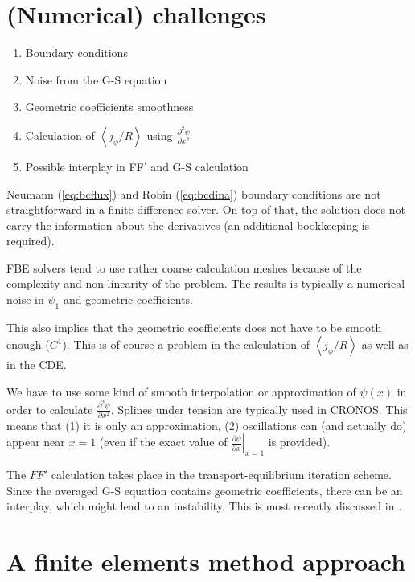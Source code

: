 \section{(Numerical) challenges}

\begin{enumerate}
\item Boundary conditions
\item Noise from the G-S equation
\item Geometric coefficients smoothness
\item Calculation of $\left\langle {{j_\phi }/R} \right\rangle$ using $\frac{{{\partial ^2}\psi }}{{\partial {x^2}}}$
\item Possible interplay in FF' and G-S calculation
\end{enumerate}

Neumann (\ref{eq:bcflux}) and Robin (\ref{eq:bcdina}) boundary conditions
are not straightforward in a finite difference solver. On top of that, the solution
does not carry the information about the derivatives (an additional bookkeeping
is required).

FBE solvers tend to use rather coarse calculation meshes because of the complexity
and non-linearity of the problem. The results is typically a numerical noise in
$\psi_1$ and geometric coefficients.

This also implies that the geometric coefficients does not have to be smooth enough ($C^1$).
This is of course a problem in the calculation of $\left\langle {{j_\phi }/R} \right\rangle$
as well as in the CDE.

We have to use some kind of smooth interpolation or approximation of $\psi\left( x \right)$ 
in order to calculate $\frac{{{\partial ^2}\psi }}{{\partial {x^2}}}$. 
Splines under tension are typically used in CRONOS. This means that (1) it is only
an approximation, (2) oscillations can (and actually do) appear near $x=1$ 
(even if the exact value of
$\left.{\frac{{\partial \psi }}{{\partial x }}} \right|_{x  = 1}$ is provided).

The $FF'$ calculation takes place in the transport-equilibrium iteration scheme. Since
the averaged G-S equation contains geometric coefficients, there can be an interplay,
which might lead to an instability. This is most recently discussed in \cite{FableScheme2013}.

\section{A finite elements method approach}

